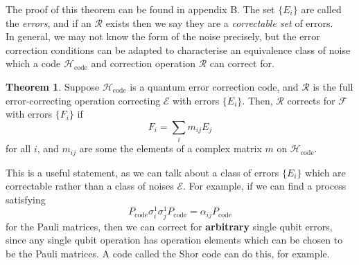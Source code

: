 \documentclass[12pt,a4paper]{report}
\numberwithin{equation}{section}
\newcommand{\Pc}{P_{\text{code}}}
\newcommand{\Hcode}{\mathcal{H}_{\text{code}}}
\theoremstyle{definition}
\theoremstyle{theorem}
\newtheorem{theorem}{Theorem}[section]
\theoremstyle{theorem}
\theoremstyle{example}
\theoremstyle{definition}
\begin{document}
The proof of this theorem can be found in appendix B. The set $\{E_{i}\}$ are called the \textit{errors}, and if an $\mathcal{R}$ exists then we say they are a \textit{correctable set} of errors.\\
In general, we may not know the form of the noise precisely, but the error correction conditions can be adapted to characterise an equivalence class of noise which a code $\Hcode$ and correction operation $\mathcal{R}$ can correct for.
\begin{theorem}
	Suppose $\Hcode$ is a quantum error correction code, and $\mathcal{R}$ is the full error-correcting operation correcting $\mathcal{E}$ with errors $\{E_{i}\}$. Then, $\mathcal{R}$ corrects for $\mathcal{F}$ with errors $\{F_{i}\}$ if
	\begin{equation}
		F_{i}=\sum_{i}m_{ij}E_{j}
	\end{equation}
	for all $i$, and $m_{ij}$ are some the elements of a complex matrix $m$ on $\Hcode$.
\end{theorem}
This is a useful statement, as we can talk about a class of errors $\{E_{i}\}$ which are correctable rather than a class of noises $\mathcal{E}$. For example, if we can find a process satisfying
\begin{equation}
	\Pc \sigma_{i}^{1}\sigma_{j}^{1}\Pc=\alpha_{ij}\Pc
\end{equation}
for the Pauli matrices, then we can correct for \textbf{arbitrary} single qubit errors, since any single qubit operation has operation elements which can be chosen to be the Pauli matrices. A code called the Shor code can do this, for example.
\end{document}
